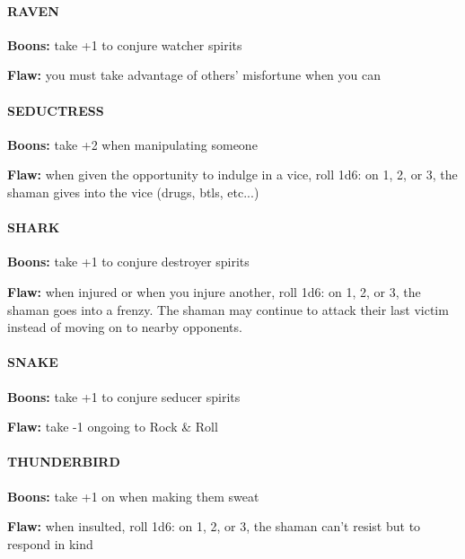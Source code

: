 \documentclass[oneside,10pt]{article}
\begin{document}
\begin{multicols}{2}
\paragraph{RAVEN}
\begin{adjustwidth*}{.5cm}{.5cm}
\textbf{Boons:} take +1 to conjure watcher spirits

\textbf{Flaw:} you must take advantage of others’ misfortune
when you can
\end{adjustwidth*}

\paragraph{SEDUCTRESS}
\begin{adjustwidth*}{.5cm}{.5cm}
\textbf{Boons:} take +2 when manipulating someone

\textbf{Flaw:} when given the opportunity to indulge in a vice, roll 1d6: on 1, 2, or 3, the shaman gives into the vice (drugs, btls, etc...)
\end{adjustwidth*}


\paragraph{SHARK}
\begin{adjustwidth*}{.5cm}{.5cm}
\textbf{Boons:} take +1 to conjure destroyer spirits

\textbf{Flaw:} when injured or when you injure another, roll 1d6: on 1, 2, or 3, the shaman
goes into a frenzy. The shaman may continue to attack their last victim instead of moving on to nearby opponents. 
\end{adjustwidth*}


\paragraph{SNAKE}
\begin{adjustwidth*}{.5cm}{.5cm}
\textbf{Boons:} take +1 to conjure seducer spirits

\textbf{Flaw:} take -1 ongoing to Rock \& Roll
\end{adjustwidth*}

\paragraph{THUNDERBIRD}
\begin{adjustwidth*}{.5cm}{.5cm}
\textbf{Boons:} take +1 on when making them sweat

\textbf{Flaw:} when insulted, roll 1d6: on 1, 2, or 3, the shaman can't resist but to respond in kind
\end{adjustwidth*}


\end{multicols}
\end{document}
